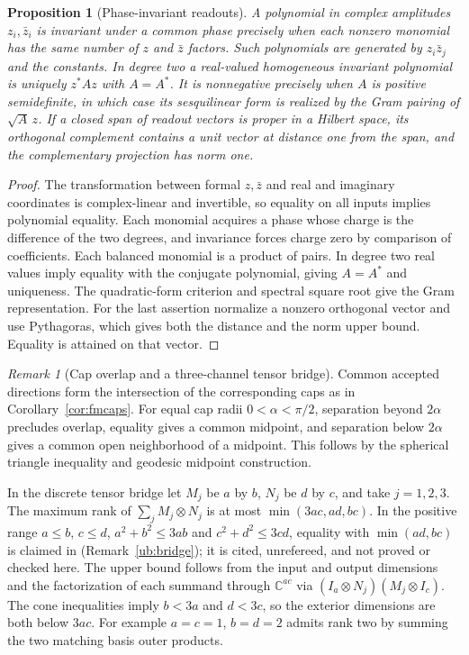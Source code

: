 \documentclass[aps,pra,onecolumn,superscriptaddress,nofootinbib,10pt]{revtex4-2}
\newtheorem{proposition}[theorem]{Proposition}
\theoremstyle{definition}
\theoremstyle{remark}
\newtheorem{remark}[theorem]{Remark}
\newcommand{\C}{\mathbb{C}}
\begin{document}
\begin{proposition}[Phase-invariant readouts]\label{ob:phaseinvariance}
A polynomial in complex amplitudes $z_i,\bar z_i$ is invariant under a
common phase precisely when each nonzero monomial has the same number
of $z$ and $\bar z$ factors. Such polynomials are generated by
$z_i\bar z_j$ and the constants. In degree two a real-valued homogeneous
invariant polynomial is uniquely $z^*Az$ with $A=A^*$.
It is nonnegative precisely when $A$ is positive semidefinite, in
which case its sesquilinear form is realized by the Gram pairing of
$\sqrt A\,z$. If a closed span of readout vectors is proper in a
Hilbert space, its orthogonal complement contains a unit vector at
distance one from the span, and the complementary projection has norm one.
\end{proposition}
\begin{proof}
The transformation between formal $z,\bar z$ and real and imaginary
coordinates is complex-linear and invertible, so equality on all
inputs implies polynomial equality. Each monomial acquires a phase
whose charge is the difference of the two degrees, and invariance
forces charge zero by comparison of coefficients. Each balanced
monomial is a product of pairs. In degree two real values imply equality
with the conjugate polynomial, giving $A=A^*$ and uniqueness.
The quadratic-form criterion and spectral square root give the Gram
representation. For the last assertion normalize a nonzero orthogonal
vector and use Pythagoras, which gives both the distance and the norm
upper bound. Equality is attained on that vector.
\end{proof}

\begin{remark}[Cap overlap and a three-channel tensor bridge]\label{ob:bridge}
Common accepted directions form the intersection of the corresponding
caps as in Corollary~\ref{cor:fmcaps}. For equal cap radii
$0<\alpha<\pi/2$, separation beyond $2\alpha$ precludes overlap,
equality gives a common midpoint, and separation below $2\alpha$
gives a common open neighborhood of a midpoint. This follows by
the spherical triangle inequality and geodesic midpoint construction.

In the discrete tensor bridge let $M_j$ be $a$ by $b$, $N_j$ be
$d$ by $c$, and take $j=1,2,3$. The maximum rank of
$\sum_j M_j\otimes N_j$ is at most $\min(3ac,ad,bc)$.
In the positive range $a\le b$, $c\le d$,
$a^2+b^2\le3ab$ and $c^2+d^2\le3cd$, equality with $\min(ad,bc)$
is claimed in \cite{obr:leanbridge} (Remark~\ref{ub:bridge}); it is cited, unrefereed, and not proved or checked here. The upper bound follows from the input and
output dimensions and the factorization of each summand through
$\C^{ac}$ via $(I_a\otimes N_j)(M_j\otimes I_c)$.
The cone inequalities imply $b<3a$ and $d<3c$, so the exterior
dimensions are both below $3ac$. For example $a=c=1$, $b=d=2$
admits rank two by summing the two matching basis outer products.
\end{remark}
\end{document}
